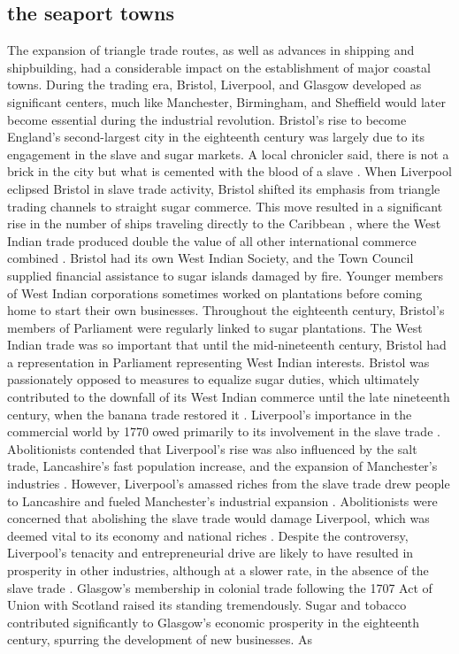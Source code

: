 \subsection{the seaport towns}
The expansion of triangle trade routes, as well as advances in shipping and shipbuilding, had a considerable impact on the establishment of major coastal towns. During the trading era, Bristol, Liverpool, and Glasgow developed as significant centers, much like Manchester, Birmingham, and Sheffield would later become essential during the industrial revolution. Bristol's rise to become England's second-largest city in the eighteenth century was largely due to its engagement in the slave and sugar markets. A local chronicler said, there is not a brick in the city but what is cemented with the blood of a slave . When Liverpool eclipsed Bristol in slave trade activity, Bristol shifted its emphasis from triangle trading channels to straight sugar commerce. This move resulted in a significant rise in the number of ships traveling directly to the Caribbean , where the West Indian trade produced double the value of all other international commerce combined . Bristol had its own West Indian Society, and the Town Council supplied financial assistance to sugar islands damaged by fire. Younger members of West Indian corporations sometimes worked on plantations before coming home to start their own businesses. Throughout the eighteenth century, Bristol's members of Parliament were regularly linked to sugar plantations. The West Indian trade was so important that until the mid-nineteenth century, Bristol had a representation in Parliament representing West Indian interests. Bristol was passionately opposed to measures to equalize sugar duties, which ultimately contributed to the downfall of its West Indian commerce until the late nineteenth century, when the banana trade restored it . Liverpool's importance in the commercial world by 1770 owed primarily to its involvement in the slave trade . Abolitionists contended that Liverpool's rise was also influenced by the salt trade, Lancashire's fast population increase, and the expansion of Manchester's industries . However, Liverpool's amassed riches from the slave trade drew people to Lancashire and fueled Manchester's industrial expansion . Abolitionists were concerned that abolishing the slave trade would damage Liverpool, which was deemed vital to its economy and national riches . Despite the controversy, Liverpool's tenacity and entrepreneurial drive are likely to have resulted in prosperity in other industries, although at a slower rate, in the absence of the slave trade . Glasgow's membership in colonial trade following the 1707 Act of Union with Scotland raised its standing tremendously. Sugar and tobacco contributed significantly to Glasgow's economic prosperity in the eighteenth century, spurring the development of new businesses. As 